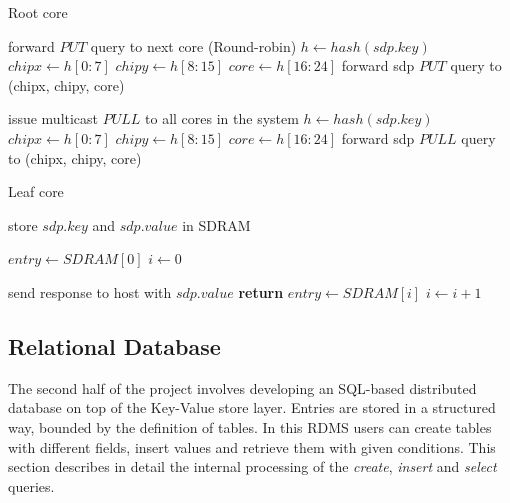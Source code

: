 \begin{algorithm}
\caption{Root core}
\label{alg:root}
\begin{algorithmic}[1]
			\State forward $PUT$ query to next core (Round-robin)
			\State $h \gets hash(sdp.key)$
			\State $chipx \gets h[0:7]$
			\State $chipy \gets h[8:15]$
			\State $core \gets h[16:24]$
			\State forward sdp $PUT$ query to (chipx, chipy, core)
		\EndIf
	\EndIf

			\State issue multicast $PULL$ to all cores in the system
			\State $h \gets hash(sdp.key)$
			\State $chipx \gets h[0:7]$
			\State $chipy \gets h[8:15]$
			\State $core \gets h[16:24]$
			\State forward sdp $PULL$ query to (chipx, chipy, core)
		\EndIf
	\EndIf
\EndProcedure
\end{algorithmic}
\end{algorithm}

\begin{algorithm}
\caption{Leaf core}
\label{alg:leaf}
\begin{algorithmic}[1]
		\State store $sdp.key$ and $sdp.value$ in SDRAM
	\EndIf

		\State $entry \gets SDRAM[0]$
		\State $i \gets 0$		
		
				\State send response to host with $sdp.value$
				\State \textbf{return}
			\EndIf
			\State $entry \gets SDRAM[i]$
			\State $i \gets i+1$
      	\EndWhile
	\EndIf
\EndProcedure
\end{algorithmic}
\end{algorithm}

\subsection{Relational Database}
The second half of the project involves developing an SQL-based distributed database on top of the Key-Value store layer. Entries are stored in a structured way, bounded by the definition of tables. In this RDMS users can create tables with different fields, insert values and retrieve them with given conditions. This section describes in detail the internal processing of the \textit{create}, \textit{insert} and \textit{select} queries. 


